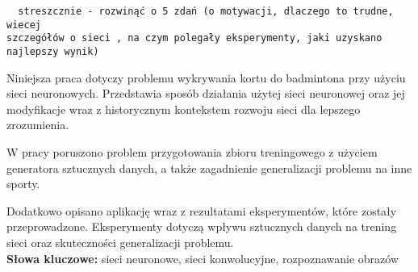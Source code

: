 \begin{verbatim}
  streszcznie - rozwinąć o 5 zdań (o motywacji, dlaczego to trudne, wiecej 
szczegółów o sieci , na czym polegały eksperymenty, jaki uzyskano 
najlepszy wynik)
\end{verbatim}

Niniejsza praca dotyczy problemu wykrywania kortu do badmintona przy użyciu sieci neuronowych. Przedstawia sposób działania użytej sieci neuronowej oraz jej modyfikacje wraz z historycznym kontekstem rozwoju sieci dla lepszego zrozumienia. 

W pracy poruszono problem przygotowania zbioru treningowego z użyciem generatora sztucznych danych, a także zagadnienie generalizacji problemu na inne sporty.

Dodatkowo opisano aplikację wraz z rezultatami eksperymentów, które zostały przeprowadzone. Eksperymenty dotyczą wpływu sztucznych danych na trening sieci oraz skuteczności generalizacji problemu. \\

\noindent \textbf{Słowa kluczowe:} sieci neuronowe, sieci konwolucyjne, rozpoznawanie obrazów
